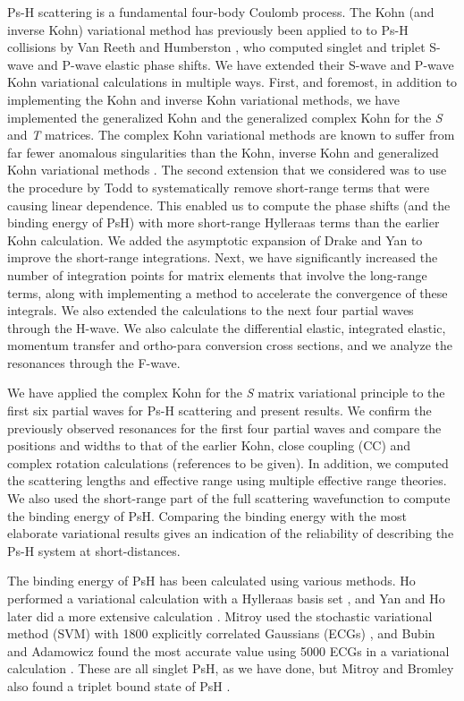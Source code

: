 \documentclass[reprint,showpacs,preprintnumbers,amsmath,amssymb,pra,aps]{revtex4-1}
\begin{document}
Ps-H scattering is a fundamental four-body Coulomb process. The Kohn (and inverse Kohn) variational method has previously been applied to
to Ps-H collisions by Van Reeth and Humberston \cite{VanReeth2003,VanReeth2004}, who computed singlet and triplet
S-wave and P-wave elastic phase shifts. 
We have extended their S-wave and P-wave Kohn variational calculations in multiple ways.
First, and foremost, in addition to implementing
the Kohn and inverse Kohn variational methods, we have
implemented the generalized Kohn and the generalized complex Kohn
for the \emph{S} and \emph{T} matrices. 
The complex Kohn variational methods are known to suffer
from far fewer anomalous singularities than the
Kohn, inverse Kohn and generalized Kohn variational methods \cite{Lucchese1989, Cooper2009, Cooper2010}. 
The second extension that we considered was to use
the procedure by Todd to systematically remove short-range terms that
were causing linear dependence.
This enabled us to compute the phase shifts (and the binding
energy of PsH) with more short-range Hylleraas terms than the earlier 
Kohn calculation. We added the asymptotic expansion of Drake and Yan \cite{Drake1995, Yan1997} to improve the short-range integrations.
Next, we have significantly increased the number of integration points for matrix elements that involve the long-range terms, along with implementing a method to accelerate the convergence of these integrals. We also extended the calculations to the next four partial waves through the H-wave. We also calculate the differential elastic, integrated elastic, momentum transfer and ortho-para conversion cross sections, and we analyze the resonances through the F-wave.

We have applied the complex Kohn for the \emph{S} matrix variational principle to the first six partial waves for Ps-H scattering and present results. We confirm the previously observed resonances for the first four partial waves and compare the positions and widths to that of the earlier Kohn, close coupling (CC) and complex rotation calculations (references to be given). In addition, we computed the scattering lengths and effective range using multiple effective range theories. We also used the short-range part of the full scattering wavefunction to compute the binding energy of PsH. Comparing the binding energy with the most elaborate variational results gives an indication of the reliability of describing the Ps-H system at short-distances.

The binding energy of PsH has been calculated using various methods. Ho performed a variational calculation with a Hylleraas basis set \cite{Ho1986}, and Yan and Ho later did a more extensive calculation \cite{Yan1999}. Mitroy used the stochastic variational method (SVM) with 1800 explicitly correlated Gaussians (ECGs) \cite{Mitroy2006}, and Bubin and Adamowicz found the most accurate value using 5000 ECGs in a variational calculation \cite{Bubin2006}. These are all singlet PsH, as we have done, but Mitroy and Bromley also found a triplet bound state of PsH \cite{Mitroy2007}.
\end{document}
